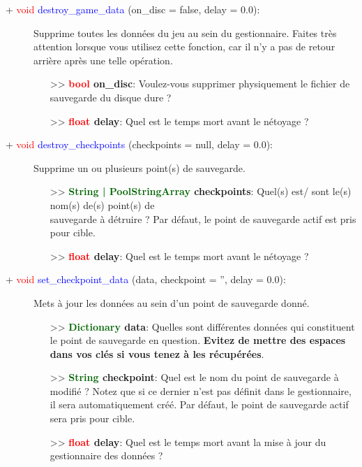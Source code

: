 \documentclass[a4paper, 11pt]{article}
\begin{document}
	\begin{description}
		\item [+ \textcolor{red}{void} \textcolor{blue}{destroy\_game\_data} (on\_disc = false, delay =
		0.0):] Supprime toutes les données du jeu au sein du gestionnaire. Faites très attention lorsque
		vous utilisez cette fonction, car il n'y a pas de retour arrière après une telle opération.
		\begin{itemize}
			\item [>> \textbf{\textcolor{red}{bool} on\_disc}:] Voulez-vous supprimer physiquement le
			fichier de sauvegarde du disque dure ?
			\item [>> \textbf{\textcolor{red}{float} delay}:] Quel est le temps mort avant le nétoyage ?\\
		\end{itemize}
	\end{description}
	\begin{description}
		\item [+ \textcolor{red}{void} \textcolor{blue}{destroy\_checkpoints} (checkpoints = null, delay =
		0.0):] Supprime un ou plusieurs point(s) de sauvegarde.
		\begin{itemize}
			\item [>> \textbf{\textcolor{darkgreen}{String | PoolStringArray} checkpoints}:] Quel(s) est/
			sont le(s) nom(s) de(s) point(s) de \\sauvegarde à détruire ? Par défaut, le point de sauvegarde
			actif est pris pour cible.
			\item [>> \textbf{\textcolor{red}{float} delay}:] Quel est le temps mort avant le nétoyage ?\\
		\end{itemize}
	\end{description}
	\begin{description}
		\item [+ \textcolor{red}{void} \textcolor{blue}{set\_checkpoint\_data} (data, checkpoint = '', delay
		= 0.0):] Mets à jour les données au sein d'un point de sauvegarde donné.
		\begin{itemize}
			\item [>> \textbf{\textcolor{darkgreen}{Dictionary} data}:] Quelles sont différentes données qui
			constituent le point de sauvegarde en question. \textbf{Evitez de mettre des espaces dans vos
			clés si vous tenez à les récupérées}.
			\item [>> \textbf{\textcolor{darkgreen}{String} checkpoint}:] Quel est le nom du point de
			sauvegarde à modifié ? Notez que si ce dernier n'est pas définit dans le gestionnaire, il sera
			automatiquement créé. Par défaut, le point de sauvegarde actif sera pris pour cible.
			\item [>> \textbf{\textcolor{red}{float} delay}:] Quel est le temps mort avant la mise à jour du
			gestionnaire des données ?\\
		\end{itemize}
	\end{description}
\end{document}
